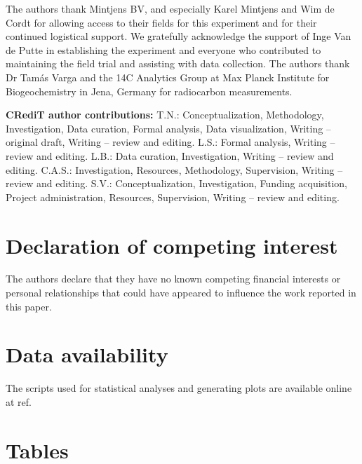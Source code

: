 \documentclass[preprint,12pt]{elsarticle}
\begin{document}
The authors thank Mintjens BV, and especially Karel Mintjens and Wim de Cordt for allowing access to their fields for this experiment and for their continued logistical support. We gratefully acknowledge the support of Inge Van de Putte in establishing the experiment and everyone who contributed to maintaining the field trial and assisting with data collection. The authors thank Dr Tam\'as Varga and the 14C Analytics Group at Max Planck Institute for Biogeochemistry in Jena, Germany for radiocarbon measurements. 

  
\textbf{CRediT author contributions:} T.N.: Conceptualization, Methodology, Investigation, Data curation, Formal analysis, Data visualization, Writing – original draft, Writing – review and editing. L.S.: Formal analysis, Writing – review and editing. L.B.: Data curation, Investigation, Writing – review and editing. C.A.S.: Investigation, Resources, Methodology, Supervision, Writing – review and editing. S.V.: Conceptualization, Investigation, Funding acquisition, Project administration, Resources, Supervision, Writing – review and editing. 


\section*{Declaration of competing interest}

The authors declare that they have no known competing financial interests or personal relationships that could have appeared to influence the work reported in this paper.

\section*{Data availability}

The scripts used for statistical analyses and generating plots are available online at ref.

\clearpage
\section*{Tables}
\end{document}
